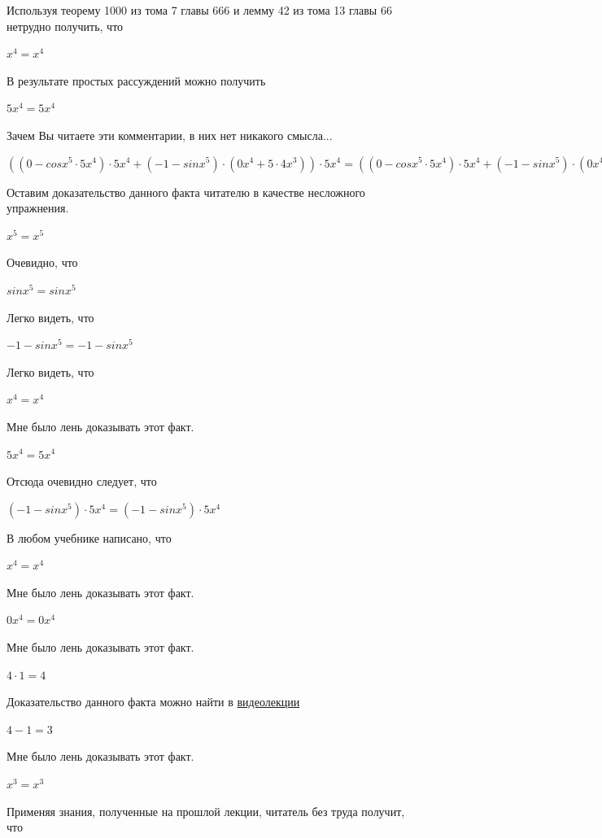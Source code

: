 \documentclass[12pt,a4paper,fleqn]{article}
\theoremstyle{definition}
\begin{document}
Используя теорему 1000 из тома 7 главы 666 и лемму 42 из тома 13 главы 66 нетрудно получить, что 

${ x }^{ 4 } = { x }^{ 4 }$

В результате простых рассуждений можно получить 

$ 5 { x }^{ 4 } =  5 { x }^{ 4 }$

Зачем Вы читаете эти комментарии, в них нет никакого смысла... 

$(( 0  - cos{ x }^{ 5 } \cdot  5 { x }^{ 4 }) \cdot  5 { x }^{ 4 } + ( -1  - sin{ x }^{ 5 }) \cdot ( 0 { x }^{ 4 } +  5  \cdot  4 { x }^{ 3 })) \cdot  5 { x }^{ 4 } = (( 0  - cos{ x }^{ 5 } \cdot  5 { x }^{ 4 }) \cdot  5 { x }^{ 4 } + ( -1  - sin{ x }^{ 5 }) \cdot ( 0 { x }^{ 4 } +  5  \cdot  4 { x }^{ 3 })) \cdot  5 { x }^{ 4 }$

Оставим доказательство данного факта читателю в качестве несложного упражнения. 

${ x }^{ 5 } = { x }^{ 5 }$

Очевидно, что 

$sin{ x }^{ 5 } = sin{ x }^{ 5 }$

Легко видеть, что 

$ -1  - sin{ x }^{ 5 } =  -1  - sin{ x }^{ 5 }$

Легко видеть, что 

${ x }^{ 4 } = { x }^{ 4 }$

Мне было лень доказывать этот факт.

$ 5 { x }^{ 4 } =  5 { x }^{ 4 }$

Отсюда очевидно следует, что 

$( -1  - sin{ x }^{ 5 }) \cdot  5 { x }^{ 4 } = ( -1  - sin{ x }^{ 5 }) \cdot  5 { x }^{ 4 }$

В любом учебнике написано, что 

${ x }^{ 4 } = { x }^{ 4 }$

Мне было лень доказывать этот факт.

$ 0 { x }^{ 4 } =  0 { x }^{ 4 }$

Мне было лень доказывать этот факт.

$ 4  \cdot  1  =  4 $

Доказательство данного факта можно найти в \href{https://www.youtube.com/watch?v=dQw4w9WgXcQ}{видеолекции} 

$ 4  -  1  =  3 $

Мне было лень доказывать этот факт.

${ x }^{ 3 } = { x }^{ 3 }$

Применяя знания, полученные на прошлой лекции, читатель без труда получит, что 
\end{document}
